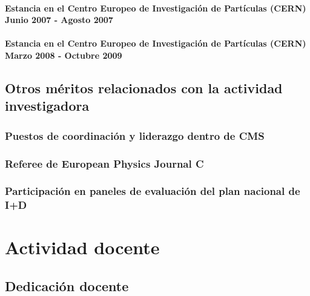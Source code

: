 \documentclass[a4paper, 11pt, twoside, openright]{report}
\begin{document}
\subsubsection{Estancia en el Centro Europeo de Investigación de Partículas (CERN) Junio 2007 - Agosto 2007}



\subsubsection{Estancia en el Centro Europeo de Investigación de Partículas (CERN) Marzo 2008 - Octubre 2009}



\section{Otros méritos relacionados con la actividad investigadora}

\subsection{Puestos de coordinación y liderazgo dentro de CMS}



\subsection{Referee de European Physics Journal C}



\subsection{Participación en paneles de evaluación del plan nacional de I+D}





\chapter{Actividad docente}

\section{Dedicación docente}
\end{document}
